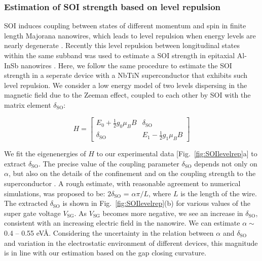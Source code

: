 \subsubsection{Estimation of SOI strength based on level repulsion}
SOI induces coupling between states of different momentum and spin in finite length Majorana nanowires, which leads to level repulsion when energy levels are nearly degenerate \cite{Stanescu2013}.
Recently this level repulsion between longitudinal states within the same subband was used to estimate a SOI strength in epitaxial Al-InSb nanowires \cite{DeMoor2018}.
Here, we follow the same procedure to estimate the SOI strength in a seperate device with a NbTiN superconductor that exhibits such level repulsion.
We consider a low energy model of two levels dispersing in the magnetic field due to the Zeeman effect, coupled to each other by SOI with the matrix element $\delta_{\mathrm{SO}}$:

\begin{equation}
H = \begin{bmatrix}
E_0 + \frac{1}{2}g_0 \mu_B B & \delta_{\mathrm{SO}} \\
\delta_{\mathrm{SO}} & E_1 - \frac{1}{2}g_1 \mu_B B
\end{bmatrix}
\end{equation}

We fit the eigenenergies of $H$ to our experimental data [Fig.~\ref{fig:SOIlevelrep}a] to extract $\delta_{\mathrm{SO}}$.
The precise value of the coupling parameter $\delta_{\mathrm{SO}}$ depends not only on $\alpha$, but also on the details of the confinement and on the coupling strength to the superconductor \cite{DeMoor2018}.
A rough estimate, with reasonable agreement to numerical simulations, was proposed to be: $2\delta_{\mathrm{SO}}$ = $\alpha \pi/ L$, where $L$ is the length of the wire.
The extracted $\delta_{\mathrm{SO}}$ is shown in Fig.~\ref{fig:SOIlevelrep}(b) for various values of the super gate voltage $V_{\mathrm{SG}}$.
As $V_{\mathrm{SG}}$ becomes more negative, we see an increase in $\delta_{\mathrm{SO}}$, consistent with an increasing electric field in the nanowire.
We can estimate $\alpha \sim$ 0.4 -- 0.55 eV\AA.
Considering the uncertainty in the relation between $\alpha$ and $\delta_{\mathrm{SO}}$ and variation in the electrostatic environment of different devices, this magnitude is in line with our estimation based on the gap closing curvature.

